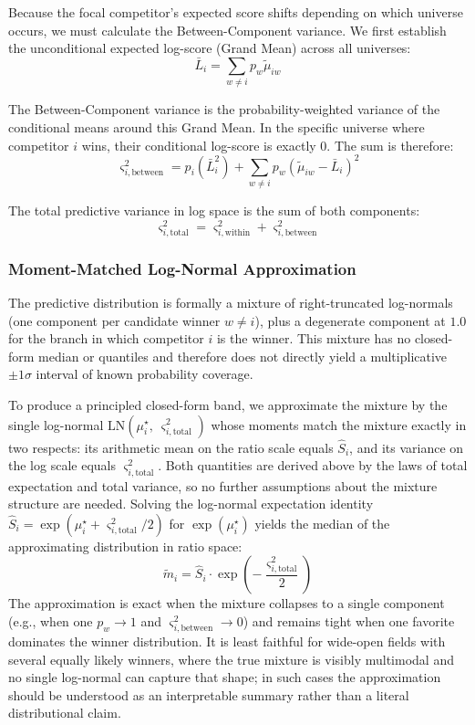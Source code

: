 \documentclass[12pt]{article}
\begin{document}
	Because the focal competitor's expected score shifts depending on which universe occurs, we must calculate the Between-Component variance. We first establish the unconditional expected log-score (Grand Mean) across all universes:
	\begin{equation}
		\bar{L}_i = \sum_{w \neq i} p_w \tilde{\mu}_{iw}
	\end{equation}

	The Between-Component variance is the probability-weighted variance of the conditional means around this Grand Mean. In the specific universe where competitor $i$ wins, their conditional log-score is exactly $0$. The sum is therefore:
	\begin{equation}
		\varsigma_{i,\mathrm{between}}^2 = p_i (\bar{L}_i^2) + \sum_{w \neq i} p_w (\tilde{\mu}_{iw} - \bar{L}_i)^2
	\end{equation}

	The total predictive variance in log space is the sum of both components:
	\begin{equation}
		\varsigma_{i,\mathrm{total}}^2 = \varsigma_{i,\mathrm{within}}^2 + \varsigma_{i,\mathrm{between}}^2
	\end{equation}

	\subsubsection*{Moment-Matched Log-Normal Approximation}
	The predictive distribution is formally a mixture of right-truncated log-normals (one component per candidate winner $w \neq i$), plus a degenerate component at $1.0$ for the branch in which competitor $i$ is the winner. This mixture has no closed-form median or quantiles and therefore does not directly yield a multiplicative $\pm 1\sigma$ interval of known probability coverage.

	To produce a principled closed-form band, we approximate the mixture by the single log-normal $\mathrm{LN}(\mu_i^\star,\ \varsigma_{i,\mathrm{total}}^2)$ whose moments match the mixture exactly in two respects: its arithmetic mean on the ratio scale equals $\hat{S}_i$, and its variance on the log scale equals $\varsigma_{i,\mathrm{total}}^2$. Both quantities are derived above by the laws of total expectation and total variance, so no further assumptions about the mixture structure are needed. Solving the log-normal expectation identity $\hat{S}_i = \exp(\mu_i^\star + \varsigma_{i,\mathrm{total}}^2/2)$ for $\exp(\mu_i^\star)$ yields the median of the approximating distribution in ratio space:
	\begin{equation}
		\tilde{m}_i = \hat{S}_i \cdot \exp\!\left(-\frac{\varsigma_{i,\mathrm{total}}^2}{2}\right)
	\end{equation}
	The approximation is exact when the mixture collapses to a single component (e.g., when one $p_w \to 1$ and $\varsigma_{i,\mathrm{between}}^2 \to 0$) and remains tight when one favorite dominates the winner distribution. It is least faithful for wide-open fields with several equally likely winners, where the true mixture is visibly multimodal and no single log-normal can capture that shape; in such cases the approximation should be understood as an interpretable summary rather than a literal distributional claim.
\end{document}
